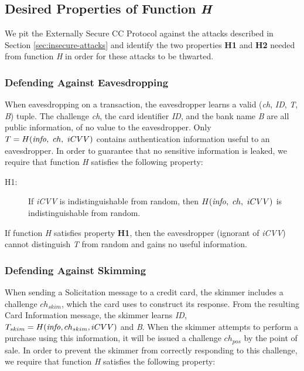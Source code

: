 \subsection{Desired Properties of Function \emph{H}}
\label{external-h-properties}

We pit the Externally Secure CC Protocol against the attacks described in Section \ref{sec:insecure-attacks}
	and identify the two properties \textbf{H1} and \textbf{H2} needed from function \emph{H} in order for these attacks to be thwarted.

\subsubsection*{Defending Against Eavesdropping}
When eavesdropping on a transaction, the eavesdropper learns a valid (\emph{ch}, \emph{ID}, \emph{T}, \emph{B}) tuple.
The challenge \emph{ch}, the card identifier \emph{ID}, and the bank name \emph{B} are all public information, of no value to the eavesdropper.
Only $T = H(\textrm{\emph{info}},~ ch,~ iCVV)$ contains authentication information useful to an eavesdropper.
In order to guarantee that no sensitive information is leaked, we require that function \emph{H} satisfies the following property:

\begin{description}
\item[H1:] If \emph{iCVV} is indistinguishable from random, then $H(\textrm{\emph{info}},~ ch,~ iCVV)$ is indistinguishable from random.
\end{description}

If function \emph{H} satisfies property \textbf{H1}, then the eavesdropper (ignorant of \emph{iCVV}) cannot distinguish \emph{T} from random and gains no useful information.








\subsubsection*{Defending Against Skimming}
When sending a Solicitation message to a credit card, the skimmer includes a challenge $ch_{skim}$, which the card uses to construct its response.
From the resulting Card Information message, the skimmer learns \emph{ID}, $T_{skim} = H(\textrm{\emph{info}}, ch_{skim}, iCVV)$ and \emph{B}.
When the skimmer attempts to perform a purchase using this information, it will be issued a challenge $ch_{pos}$ by the point of sale.
In order to prevent the skimmer from correctly responding to this challenge, we require that function \emph{H} satisfies the following property:

